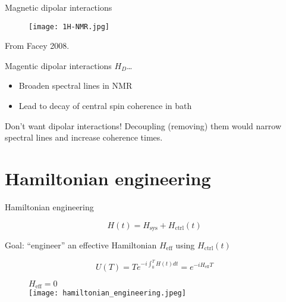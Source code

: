 \documentclass{beamer}
\begin{document}
\begin{frame}{Magnetic dipolar interactions}

\begin{figure}
\centering
\texttt{[image: 1H-NMR.jpg]}
\hfill
\scalebox{.6}{

}
\end{figure}
\vspace{-1em}
\hspace{3em}
{\scriptsize%
\nocite{Ottowa-NMR}
From Facey 2008.%
}

Magentic dipolar interactions $H_D$\dots
\begin{itemize}
    \item Broaden spectral lines in NMR
    \item Lead to decay of central spin coherence in bath
\end{itemize}

Don't want dipolar interactions! Decoupling (removing) them would narrow spectral lines and increase coherence times.


\end{frame}

\section{Hamiltonian engineering}


\begin{frame}{Hamiltonian engineering}


\[
H(t) = H_{\text{sys}} + H_{\text{ctrl}}(t)
\]

Goal: ``engineer'' an effective Hamiltonian $H_{\text{eff}}$ using $H_{\text{ctrl}}(t)$

\[
U(T) = Te^{-i \int_0^T H(t) dt } = e^{-i H_{\text{eff}} T}
\]

\begin{figure}
$H_{\text{eff}} = 0$ \\
\texttt{[image: hamiltonian\_engineering.jpeg]}
\end{figure}



\end{frame}
\end{document}
